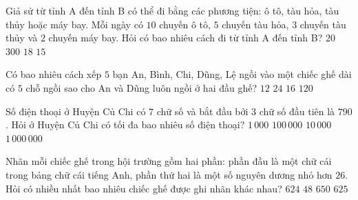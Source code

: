 \begin{ex}%
	Giả sử từ tỉnh A đến tỉnh B có thể đi bằng các phương tiện: ô tô, tàu hỏa, tàu thủy hoặc máy bay. Mỗi ngày có $10$ chuyến ô tô, $5$ chuyến tàu hỏa, $3$ chuyến tàu thủy và $2$ chuyến máy bay. Hỏi có  bao nhiêu cách đi từ tỉnh A đến tỉnh B?
	 \choice
		{$20$} 
		{\True  $300$}
		{$18$} 
		 {$15$}
\end{ex}

\begin{ex}%
	Có bao nhiêu cách xếp $5$ bạn An,  Bình, Chi, Dũng, Lệ ngồi vào một chiếc ghế dài có $5$ chỗ ngồi sao cho An và Dũng luôn ngồi ở hai đầu ghế?
	 \choice
		{\True  $12$}
		 {$24$}
		 {$16$}
		{$120$} 
\end{ex}

\begin{ex}%
	Số điện thoại ở Huyện Củ  Chi có $7$ chữ số và bắt đầu bởi $3$ chữ số đầu tiên là $790$. Hỏi ở Huyện Củ Chi có tối đa bao nhiêu số điện thoại?
	\choice 
		{$1\,000$} 
		 {$100\,000$}
		 {\True $10\,000$}
		 {$1\,000\,000$}
\end{ex}

\begin{ex}%
	Nhãn  mỗi chiếc ghế trong hội trường gồm hai phần: phần đầu là một chữ cái trong bảng chữ cái tiếng Anh, phần thứ hai là một số nguyên dương nhỏ hơn $26$. Hỏi có nhiều nhất bao nhiêu chiếc ghế được ghi nhãn khác nhau?
	\choice 
		 {$624$}
		{$48$} 
		 {\True $650$}
		 {$625$}
\end{ex}

